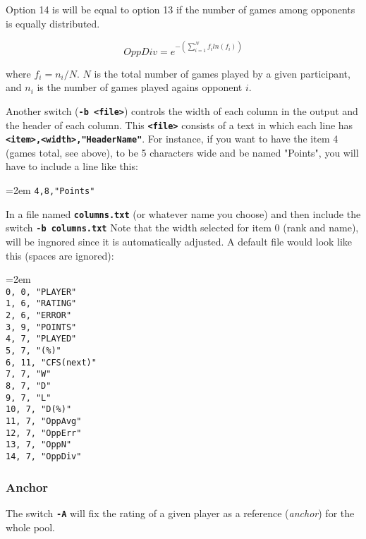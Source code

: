 \documentclass[12pt]{article}
\newcommand{\swtch} [1] {\texttt{\textbf{#1}}}
\newcommand{\cmdln}[1]{
	\par
	\begingroup
		\leftskip=2em
		\addtolength{\rightskip}{0em}
		\noindent \small{\texttt{#1}}
		\par
	\endgroup
}
\begin{document}
Option 14 is will be equal to option 13 if the number of games among opponents is equally distributed.

	\begin{equation}
	OppDiv = e^{ -\left(\sum\limits_{i=1}^N f_{i} ln(f_{i})\right) }
	\end{equation}

where $f_{i} = n_{i}/N$. $N$ is the total number of games played by a given participant, and $n_{i}$ is the number of games played agains opponent $i$.

Another switch (\swtch{-b <file>}) controls the width of each column in the output and the header of each column.
This \swtch{<file>} consists of a text in which each line has \swtch{<item>,<width>,"HeaderName"}.
For instance, if you want to have the item 4 (games total, see above), to be 5 characters wide and be named "Points", you will have to include a line like this:

\cmdln{4,8,"Points"}

In a file named \swtch{columns.txt} (or whatever name you choose) and then include the switch \swtch{-b columns.txt}
Note that the width selected for item 0 (rank and name), will be ingnored since it is automatically adjusted.
A default file would look like this (spaces are ignored):

\cmdln{\\
 0,  0, "PLAYER"\\
 1,  6, "RATING"\\
 2,  6, "ERROR"\\ 
 3,  9, "POINTS"\\
 4,  7, "PLAYED"\\
 5,  7, "(\%)"\\
 6, 11, "CFS(next)"\\
 7,  7, "W"\\
 8,  7, "D"\\
 9,  7, "L"\\
10,  7, "D(\%)"\\
11,  7, "OppAvg"\\
12,  7, "OppErr"\\
13,  7, "OppN"\\
14,  7, "OppDiv"}

\subsubsection*{Anchor}
The switch \swtch{-A} will fix the rating of a given player as a reference (\textit{anchor}) for the whole pool.
\end{document}

